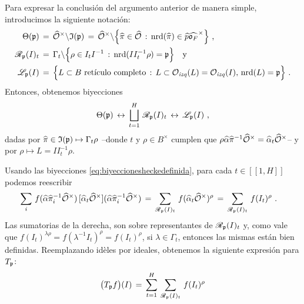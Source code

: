 Para expresar la conclusi\'{o}n del argumento anterior de manera simple,
introducimos la siguiente notaci\'{o}n:
\begin{align*}
	\Theta(\frak p) & \,=\,\Idfin{\cal O}\backslash\frak I(\frak p) \,=\,
		\Idfin{\cal O}\backslash
			\Big\{\hhat\pi\in\Adfin{\cal O}\,:\,
				\nrd(\hhat\pi)\in\hhat p\Idfin{\oka F}\Big\}
		\text{ ,} \\
	\mathscr R_{\frak p}(I)_t & \,=\,\Gamma_t\backslash
		\Big\{\rho\in I_tI^{-1}\,:\,\nrd(II_t^{-1}\rho)=\frak p\Big\}
		\quad\text{y} \\
	\mathscr L_{\frak p}(I) & \,=\,\Big\{L\subset B \text{ ret\'{\i}culo completo}
		\,:\,L\subset\Oizq(L)=\Oizq(I),\,\nrd(L)=\frak p
		\Big\}
	\text{ .}
\end{align*}
%
Entonces, obtenemos biyecciones
\begin{equation}
	\label{eq:biyeccionesheckedefinida}
	\Theta(\frak p) \,\leftrightarrow\,
		\bigsqcup_{t=1}^{H}\,\mathscr R_{\frak p}(I)_t
			\,\leftrightarrow\,
		\mathscr L_{\frak p}(I)
	\text{ ,}
\end{equation}
%
dadas por
\begin{math}
	\hhat\pi\in\frak I(\frak p)\mapsto\Gamma_t\rho
\end{math} --donde $t$ y $\rho\in B^\times$ cumplen que
\begin{math}
	\rho\hhat\alpha\hhat\pi^{-1}\Idfin{\cal O}=
		\hhat\alpha_t\Idfin{\cal O}
\end{math}-- y por
\begin{math}
	\rho\mapsto L=II_t^{-1}\rho
\end{math}.

Usando las biyecciones \eqref{eq:biyeccionesheckedefinida}, para cada
$t\in[\![1,H]\!]$ podemos reescribir
\begin{align*}
	\sum_i\,f(\hhat\alpha\hhat\pi_i^{-1}\Idfin{\cal O})\,
		[\hhat\alpha_t\Idfin{\cal O}]
			(\hhat\alpha\hhat\pi_i^{-1}\Idfin{\cal O}) & \,=\,
		\sum_{\mathscr R_{\frak p}(I)_t}\,
			f(\hhat\alpha_t\Idfin{\cal O})^{\rho} \,=\,
		\sum_{\mathscr R_{\frak p}(I)_t}\,f(I_t)^\rho
	\text{ .}
\end{align*}
%
Las sumatorias de la derecha, son sobre representantes de
$\mathscr R_{\frak p}(I)_t$ y, como vale que
$f(I_t)^{\lambda\rho}=f(\lambda^{-1} I_t)^\rho=f(I_t)^\rho$, si
$\lambda\in\Gamma_t$, entonces las mismas est\'{a}n bien definidas.
Reemplazando id\`{e}les por ideales, obtenemos la siguiente expresi\'{o}n para
$T_{\frak p}$:
\begin{equation}
	\label{eq:heckeparadefinidosconidealesyelementosglobales}
	\big(T_{\frak p}f\big)(I) \,=\,\sum_{t=1}^{H}\,
		\sum_{\mathscr R_{\frak p}(I)_t}\,f(I_t)^\rho
\end{equation}
%

